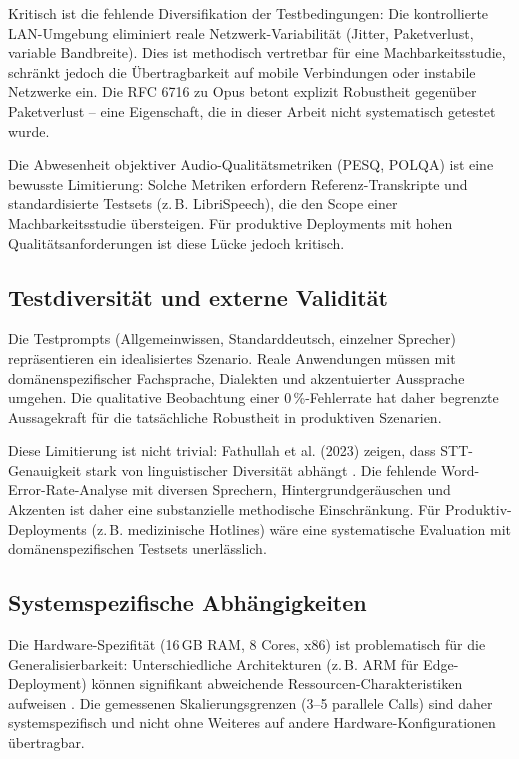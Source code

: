 Kritisch ist die fehlende Diversifikation der Testbedingungen: Die kontrollierte \acrshort{LAN}-Umgebung eliminiert reale Netzwerk-Variabilität (Jitter, Paketverlust, variable Bandbreite). Dies ist methodisch vertretbar für eine Machbarkeitsstudie, schränkt jedoch die Übertragbarkeit auf mobile Verbindungen oder instabile Netzwerke ein. Die \acrshort{RFC} 6716 zu Opus \parencite{rfc6716} betont explizit Robustheit gegenüber Paketverlust -- eine Eigenschaft, die in dieser Arbeit nicht systematisch getestet wurde.

Die Abwesenheit objektiver Audio-Qualitätsmetriken (\acrshort{PESQ}, \acrshort{POLQA}) ist eine bewusste Limitierung: Solche Metriken erfordern Referenz-Transkripte und standardisierte Testsets (z.\,B. LibriSpeech), die den Scope einer Machbarkeitsstudie übersteigen. Für produktive Deployments mit hohen Qualitätsanforderungen ist diese Lücke jedoch kritisch.

\subsection{Testdiversität und externe Validität}

Die Testprompts (Allgemeinwissen, Standarddeutsch, einzelner Sprecher) repräsentieren ein idealisiertes Szenario. Reale Anwendungen müssen mit domänenspezifischer Fachsprache, Dialekten und akzentuierter Aussprache umgehen. Die qualitative Beobachtung einer 0\,\%-Fehlerrate hat daher begrenzte Aussagekraft für die tatsächliche Robustheit in produktiven Szenarien.

Diese Limitierung ist nicht trivial: Fathullah et al. (2023) zeigen, dass \acrshort{STT}-Genauigkeit stark von linguistischer Diversität abhängt \parencite{fathullah2023_promptaudio}. Die fehlende Word-Error-Rate-Analyse mit diversen Sprechern, Hintergrundgeräuschen und Akzenten ist daher eine substanzielle methodische Einschränkung. Für Produktiv-Deployments (z.\,B. medizinische Hotlines) wäre eine systematische Evaluation mit domänenspezifischen Testsets unerlässlich.

\subsection{Systemspezifische Abhängigkeiten}

Die Hardware-Spezifität (16\,GB \acrshort{RAM}, 8 Cores, x86) ist problematisch für die Generalisierbarkeit: Unterschiedliche Architekturen (z.\,B. ARM für Edge-Deployment) können signifikant abweichende Ressourcen-Charakteristiken aufweisen \parencite{Antonova2025}. Die gemessenen Skalierungsgrenzen (3--5 parallele Calls) sind daher systemspezifisch und nicht ohne Weiteres auf andere Hardware-Konfigurationen übertragbar.

